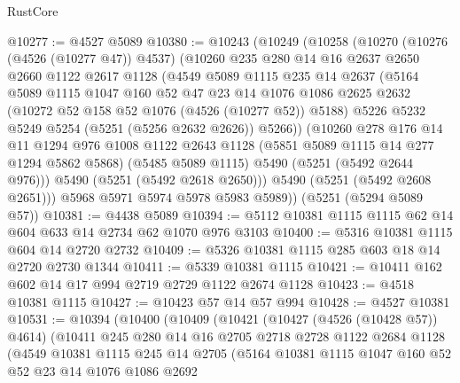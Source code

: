 \begin{lexlean}{RustCore}
\begin{coremodule}
@10277 := @4527 @5089
@10380 := @10243
    (@10249
      (@10258
        (@10270
          (@10276 (@4526 (@10277 @47)) @4537)
          (@10260
            @235
            @280
            @14
            @16
            @2637
            @2650
            @2660
            @1122
            @2617
            @1128
            (@4549
              @5089
              @1115
              @235
              @14
              @2637
              (@5164
                @5089
                @1115
                @1047
                @160
                @52
                @47
                @23
                @14
                @1076
                @1086
                @2625
                @2632
                (@10272 @52 @158 @52 @1076 (@4526 (@10277 @52)) @5188)
                @5226
                @5232
                @5249
                @5254
                (@5251 (@5256 @2632 @2626))
                @5266))
            (@10260
              @278
              @176
              @14
              @11
              @1294
              @976
              @1008
              @1122
              @2643
              @1128
              (@5851 @5089 @1115 @14 @277 @1294 @5862 @5868)
              (@5485 @5089 @1115)
              @5490
              (@5251 (@5492 @2644 @976)))
            @5490
            (@5251 (@5492 @2618 @2650)))
          @5490
          (@5251 (@5492 @2608 @2651)))
        @5968
        @5971
        @5974
        @5978
        @5983
        @5989))
    (@5251 (@5294 @5089 @57))
@10381 := @4438 @5089
@10394 := @5112 @10381 @1115 @1115 @62 @14 @604 @633 @14 @2734 @62 @1070 @976 @3103
@10400 := @5316 @10381 @1115 @604 @14 @2720 @2732
@10409 := @5326 @10381 @1115 @285 @603 @18 @14 @2720 @2730 @1344
@10411 := @5339 @10381 @1115
@10421 := @10411 @162 @602 @14 @17 @994 @2719 @2729 @1122 @2674 @1128
@10423 := @4518 @10381 @1115
@10427 := @10423 @57 @14 @57 @994
@10428 := @4527 @10381
@10531 := @10394
    (@10400
      (@10409
        (@10421
          (@10427 (@4526 (@10428 @57)) @4614)
          (@10411
            @245
            @280
            @14
            @16
            @2705
            @2718
            @2728
            @1122
            @2684
            @1128
            (@4549
              @10381
              @1115
              @245
              @14
              @2705
              (@5164
                @10381
                @1115
                @1047
                @160
                @52
                @52
                @23
                @14
                @1076
                @1086
                @2692

\end{coremodule}
\end{lexlean}
